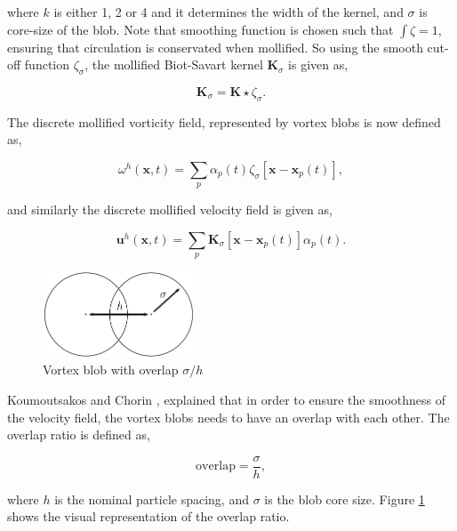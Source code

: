 where $k$ is either 1, 2 or 4 and it determines the width of the kernel, and $\sigma$ is core-size of the blob. Note that smoothing function is chosen such that $\int \zeta = 1$, ensuring that circulation is conservated when mollified. So using the smooth cut-off function $\zeta_{\sigma}$, the mollified Biot-Savart kernel $\mathbf{K}_{\sigma}$ is given as,	 

	\begin{equation}
	\mathbf{K}_{\sigma} = \mathbf{K} \star \zeta_{\sigma}.
	\end{equation}

The discrete mollified vorticity field, represented by vortex blobs is now defined as,

	\begin{equation}
	\omega^h\left(\mathbf{x},t\right) = \sum_p \alpha_p\left(t\right)\zeta_{\sigma}\left[\mathbf{x}-\mathbf{x}_p\left(t\right)\right],
	\label{eq:mollifiedVorticityField}
	\end{equation}

and similarly the discrete mollified velocity field is given as,

	\begin{equation}
	\mathbf{u}^h\left(\mathbf{x},t\right) = \sum_p \mathbf{K}_{\sigma}\left[\mathbf{x}-\mathbf{x}_p\left(t\right)\right]\alpha_p\left(t\right).
	\end{equation}

	\begin{figure}[b]
	\centering
	\includegraphics[width=0.4\textwidth]{figures/lagrangian/blobOverlap.pdf}
	\caption{Vortex blob with overlap $\sigma/h$}
	\label{fig:blobOverlap}
	\end{figure}

Koumoutsakos and Chorin \cite{Cottet2000a}, explained that in order to ensure the smoothness of the velocity field, the vortex blobs needs to have an overlap with each other. The overlap ratio is defined as,

	\begin{equation}
	\mathrm{overlap} = \frac{\sigma}{h},
	\label{eq:overlapRatio}
	\end{equation}

where $h$ is the nominal particle spacing, and $\sigma$ is the blob core size. Figure \ref{fig:blobOverlap} shows the visual representation of the overlap ratio.

